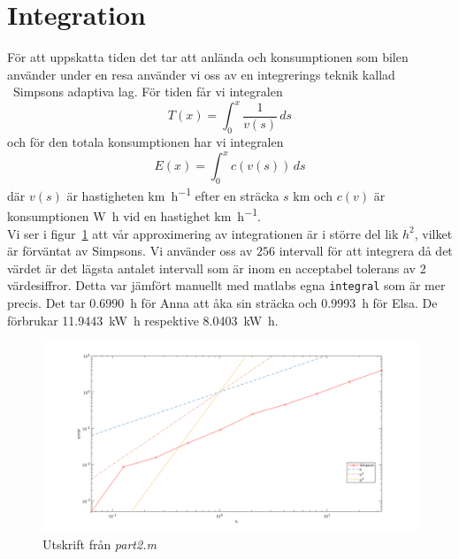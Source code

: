 \documentclass[]{scrreprt}
\begin{document}
\section{Integration}
För att uppskatta tiden det tar att anlända och konsumptionen som bilen använder under en resa använder vi oss av en integrerings teknik kallad ~Simpsons adaptiva lag.\cite[]{asimpson}
För tiden får vi integralen
\[ T(x) = \int_0^x \dfrac{1}{v(s)} \, ds \]
och för den totala konsumptionen har vi integralen
\[ E(x) = \int_0^x c(v(s)) \, ds \]
där \(v(s)\) är hastigheten \si{\kilo\meter\per\hour} efter en sträcka \(s\) \si{\kilo\meter} och \(c(v)\) är konsumptionen \si{\watt\hour} vid en hastighet \si{\kilo\meter\per\hour}.\\
Vi ser i figur~\ref{fig:conv} att vår approximering av integrationen är i större del lik \(h^2\), vilket är förväntat av Simpsons. Vi använder oss av $256$ intervall för att integrera då det värdet är det lägsta antalet intervall som är inom en acceptabel tolerans av 2 värdesiffror. Detta var jämfört manuellt med matlabs egna \texttt{integral} som är mer precis. Det tar \SI{0.6990}{\hour} för Anna att åka sin sträcka och \SI{0.9993}{\hour} för Elsa. De förbrukar \SI{11.9443}{\kilo\watt\hour} respektive \SI{8.0403}{\kilo\watt\hour}.
\begin{figure}
	\caption{Utskrift  från \textit{part2.m}}
	\label{fig:conv}
	\includegraphics[width=1.2\textwidth]{roadster/conv.png}
\end{figure}
\end{document}
